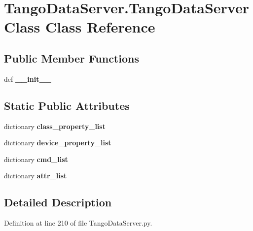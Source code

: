 \hypertarget{classTangoDataServer_1_1TangoDataServerClass}{
\section{TangoDataServer.TangoDataServerClass Class Reference}
\label{classTangoDataServer_1_1TangoDataServerClass}
}
\subsection*{Public Member Functions}
\begin{DoxyCompactItemize}
\item 
\hypertarget{classTangoDataServer_1_1TangoDataServerClass_aeedc7a8a118d369e29d5bb7ace16bf08}{
def {\bfseries \_\-\_\-init\_\-\_\-}}
\label{classTangoDataServer_1_1TangoDataServerClass_aeedc7a8a118d369e29d5bb7ace16bf08}

\end{DoxyCompactItemize}
\subsection*{Static Public Attributes}
\begin{DoxyCompactItemize}
\item 
dictionary {\bfseries class\_\-property\_\-list}
\item 
dictionary {\bfseries device\_\-property\_\-list}
\item 
dictionary {\bfseries cmd\_\-list}
\item 
dictionary {\bfseries attr\_\-list}
\end{DoxyCompactItemize}


\subsection{Detailed Description}


Definition at line 210 of file TangoDataServer.py.

